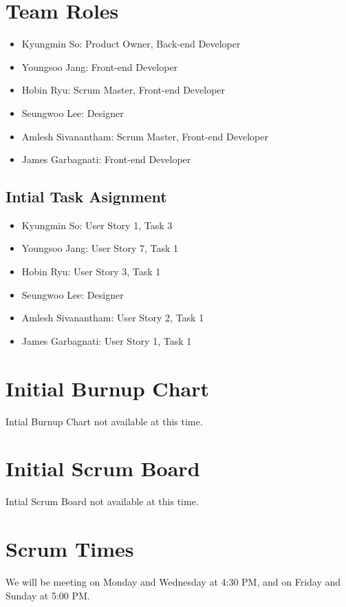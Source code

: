 \documentclass[10pt]{article}
\newcommand{\fancysecX}[2] {{\color{primary}\section*{#1} \label{sec:#2}}}
\newcommand{\fancysubX}[2] {{\color{primary}\subsection*{#1} \label{sec:#2}}}
\begin{document}
\fancysecX{Team Roles}{roles}

    \begin{itemize}
        \item Kyungmin So: Product Owner, Back-end Developer
        \item Youngsoo Jang: Front-end Developer
        \item Hobin Ryu: Scrum Master, Front-end Developer
        \item Seungwoo Lee: Designer
        \item Amlesh Sivanantham: Scrum Master, Front-end Developer
        \item James Garbagnati: Front-end Developer
    \end{itemize}

    \fancysubX{Intial Task Asignment}{intialtask}
        \begin{itemize}
            \item Kyungmin So: User Story 1, Task 3
            \item Youngsoo Jang: User Story 7, Task 1
            \item Hobin Ryu: User Story 3, Task 1
            \item Seungwoo Lee: Designer
            \item Amlesh Sivanantham: User Story 2, Task 1 
            \item James Garbagnati: User Story 1, Task 1
        \end{itemize}

\fancysecX{Initial Burnup Chart}{burnupchart}

    Intial Burnup Chart not available at this time.

\fancysecX{Initial Scrum Board}{scrumboard}

   Intial Scrum Board not available at this time.

\fancysecX{Scrum Times}{scrumTimes}

    We will be meeting on Monday and Wednesday at 4:30 PM, and on Friday and Sunday at 5:00 PM.
\end{document}

